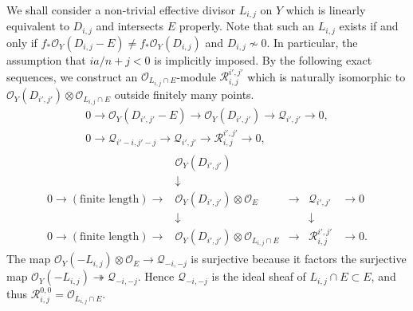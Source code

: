 \documentclass[a4paper,11pt]{amsart}
\theoremstyle{definition}
\theoremstyle{remark}
\numberwithin{equation}{section}
\newcommand{\cO}{{\mathcal O}}
\newcommand{\cQ}{{\mathcal Q}}
\newcommand{\calR}{{\mathcal R}}
\begin{document}
We shall consider a non-trivial effective divisor $L_{i,j}$ on $Y$
which is linearly equivalent to $D_{i,j}$ and intersects $E$ properly.
Note that such an $L_{i,j}$ exists if and only if
$f_*\cO_Y(D_{i,j}-E) \neq f_*\cO_Y(D_{i,j})$ and $D_{i,j} \not\sim 0$.
In particular,
the assumption that $ia/n+j<0$ is implicitly imposed.
By the following exact sequences,
we construct an $\cO_{L_{i,j} \cap E}$-module $\calR_{i,j}^{i',j'}$
which is naturally isomorphic to
$\cO_Y(D_{i',j'}) \otimes \cO_{L_{i,j} \cap E}$ outside finitely many points.
\begin{gather}
0 \to \cO_Y(D_{i',j'}-E) \to \cO_Y(D_{i',j'}) \to \cQ_{i',j'} \to 0, \\
0 \to \cQ_{i'-i,j'-j} \to \cQ_{i',j'} \to \calR_{i,j}^{i',j'} \to 0,
\label{eqn:exact_R}
\end{gather}
\begin{align}
\begin{array}{rcccl}
& \cO_Y(D_{i',j'}) & & & \\
& \downarrow  & & & \\
0 \to (\textrm{finite length}) \to &
\cO_Y(D_{i',j'}) \otimes \cO_E & \to & \cQ_{i',j'} & \to 0 \\
& \downarrow & & \downarrow & \\
0 \to (\textrm{finite length}) \to &
\cO_Y(D_{i',j'}) \otimes \cO_{L_{i,j} \cap E} & \to &
\calR_{i,j}^{i',j'} & \to 0.
\end{array}
\end{align}
The map $\cO_Y(-L_{i,j}) \otimes \cO_E \to \cQ_{-i,-j}$ is surjective
because it factors the surjective map
$\cO_Y(-L_{i,j}) \twoheadrightarrow \cQ_{-i,-j}$.
Hence $\cQ_{-i,-j}$ is the ideal sheaf of $L_{i,j} \cap E \subset E$,
and thus $\calR_{i,j}^{0,0}=\cO_{L_{i,j} \cap E}$.
\end{document}
